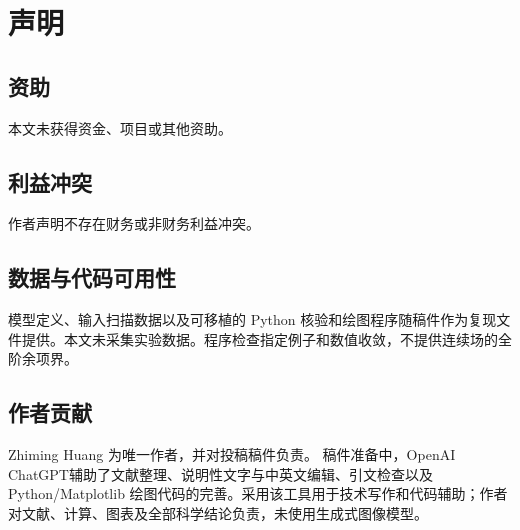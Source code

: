 \documentclass[UTF8,11pt,a4paper,fontset=none]{ctexart}
\begin{document}
\section*{声明}
\subsection*{资助}
本文未获得资金、项目或其他资助。
\subsection*{利益冲突}
作者声明不存在财务或非财务利益冲突。
\subsection*{数据与代码可用性}
模型定义、输入扫描数据以及可移植的 Python 核验和绘图程序随稿件作为复现文件提供。本文未采集实验数据。程序检查指定例子和数值收敛，不提供连续场的全阶余项界。
\subsection*{作者贡献}
Zhiming Huang 为唯一作者，并对投稿稿件负责。
稿件准备中，OpenAI ChatGPT辅助了文献整理、说明性文字与中英文编辑、引文检查以及 Python/Matplotlib 绘图代码的完善。采用该工具用于技术写作和代码辅助；作者对文献、计算、图表及全部科学结论负责，未使用生成式图像模型。


\end{document}
